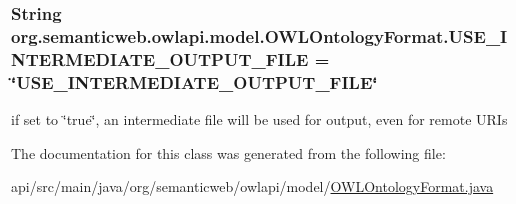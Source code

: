 \hypertarget{classorg_1_1semanticweb_1_1owlapi_1_1model_1_1_o_w_l_ontology_format_a8fb685783a685bc36f7f966b066d2c77}{
\subsubsection[{U\-S\-E\-\_\-\-I\-N\-T\-E\-R\-M\-E\-D\-I\-A\-T\-E\-\_\-\-O\-U\-T\-P\-U\-T\-\_\-\-F\-I\-L\-E}]{\setlength{\rightskip}{0pt plus 5cm}String org.\-semanticweb.\-owlapi.\-model.\-O\-W\-L\-Ontology\-Format.\-U\-S\-E\-\_\-\-I\-N\-T\-E\-R\-M\-E\-D\-I\-A\-T\-E\-\_\-\-O\-U\-T\-P\-U\-T\-\_\-\-F\-I\-L\-E = \char`\"{}U\-S\-E\-\_\-\-I\-N\-T\-E\-R\-M\-E\-D\-I\-A\-T\-E\-\_\-\-O\-U\-T\-P\-U\-T\-\_\-\-F\-I\-L\-E\char`\"{}\hspace{0.3cm}{\ttfamily [static]}}}\label{classorg_1_1semanticweb_1_1owlapi_1_1model_1_1_o_w_l_ontology_format_a8fb685783a685bc36f7f966b066d2c77}
if set to \char`\"{}true\char`\"{}, an intermediate file will be used for output, even for remote U\-R\-Is 

The documentation for this class was generated from the following file\-:\begin{DoxyCompactItemize}
\item 
api/src/main/java/org/semanticweb/owlapi/model/\hyperlink{_o_w_l_ontology_format_8java}{O\-W\-L\-Ontology\-Format.\-java}\end{DoxyCompactItemize}
